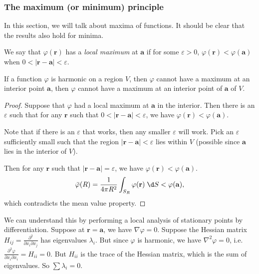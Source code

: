 \documentclass[a4paper]{article}
\begin{document}
\subsubsection{The maximum (or minimum) principle}
In this section, we will talk about maxima of functions. It should be clear that the results also hold for minima.

\begin{defi}
  We say that $\varphi(\mathbf{r})$ has a \emph{local maximum} at $\mathbf{a}$ if for some $\varepsilon > 0$, $\varphi(\mathbf{r}) < \varphi(\mathbf{a})$ when $0 < |\mathbf{r} - \mathbf{a}| < \varepsilon$.
\end{defi}

\begin{prop}
  If a function $\varphi$ is harmonic on a region $V$, then $\varphi$ cannot have a maximum at an interior point $\mathbf{a}$, then $\varphi$ cannot have a maximum at an interior point of $\mathbf{a}$ of $V$.
\end{prop}

\begin{proof}
  Suppose that $\varphi$ had a local maximum at $\mathbf{a}$ in the interior. Then there is an $\varepsilon$ such that for any $\mathbf{r}$ such that $0 < |\mathbf{r} - \mathbf{a}| < \varepsilon$, we have $\varphi(\mathbf{r}) < \varphi (\mathbf{a})$.

  Note that if there is an $\varepsilon$ that works, then any smaller $\varepsilon$ will work. Pick an $\varepsilon$ sufficiently small such that the region $|\mathbf{r} - \mathbf{a}| < \varepsilon$ lies within $V$ (possible since $\mathbf{a}$ lies in the interior of $V$).

  Then for any $\mathbf{r}$ such that $|\mathbf{r} - \mathbf{a}| = \varepsilon$, we have $\varphi(\mathbf{r}) < \varphi(\mathbf{a})$.
  \[
    \bar\varphi (R) = \frac{1}{4\pi R^2}\int_{S_R}\varphi(\mathbf{r})\;\d S < \varphi(\mathbf{a}),
  \]
  which contradicts the mean value property.
\end{proof}

We can understand this by performing a local analysis of stationary points by differentiation. Suppose at $\mathbf{r} = \mathbf{a}$, we have $\nabla\varphi = 0$. Suppose the Hessian matrix $H_{ij} = \frac{\partial^2}{\partial x_i \partial x_j}$ has eigenvalues $\lambda_i$. But since $\varphi$ is harmonic, we have $\nabla^2 \varphi = 0$, i.e. $\frac{\partial^2\varphi}{\partial x_i\partial x_i} = H_{ii} = 0$. But $H_{ii}$ is the trace of the Hessian matrix, which is the sum of eigenvalues. So $\sum \lambda_i = 0$.
\end{document}
